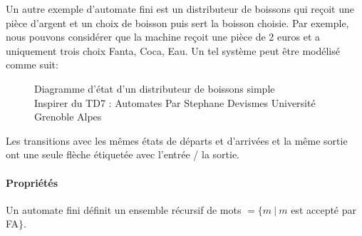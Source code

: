 Un autre exemple d'automate fini est un distributeur de boissons qui reçoit une pièce d'argent et un choix de boisson puis sert la boisson choisie. Par exemple, nous pouvons considérer que la machine reçoit une pièce de 2 euros et a uniquement trois choix Fanta, Coca, Eau. Un tel système peut être modélisé comme suit:\\

\begin{figure}[H]
	\centering
	\caption{Diagramme d'état d'un distributeur de boissons simple \\{Inspirer du TD7 : Automates Par Stephane Devismes Université Grenoble Alpes}}
\end{figure}
Les transitions avec les mêmes états de départs et d’arrivées et la même sortie ont une seule flèche étiquetée avec l’entrée / la sortie. 

\paragraph{Propriétés}
\begin{myprop}
	Un automate fini définit un ensemble récursif de mots $=\{m \ |\ m$ est
		accepté par FA$\}$.
\end{myprop}

